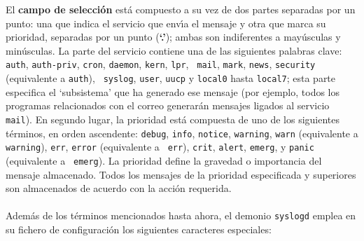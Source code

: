 El {\bf campo de selecci\'on} est\'a compuesto a su vez de dos partes 
separadas por un punto: una que indica el servicio que env\'{\i}a el mensaje y 
otra que marca su prioridad, separadas por un punto ({\bf `.'}); ambas son 
indiferentes a may\'usculas y min\'usculas. La parte del servicio contiene una 
de las siguientes palabras clave: {\tt 
auth}, {\tt auth-priv}, {\tt cron}, {\tt daemon}, {\tt kern}, {\tt lpr}, {\tt 
mail}, {\tt mark}, {\tt news}, {\tt security} (equivalente a {\tt auth}), {\tt 
syslog}, {\tt user}, {\tt uucp} y {\tt local0} hasta {\tt local7}; esta parte 
especifica el `subsistema' que ha generado ese mensaje (por ejemplo, todos los 
programas relacionados con el correo generar\'an mensajes ligados al servicio 
{\tt mail}). En segundo lugar, la prioridad est\'a compuesta de uno de los 
siguientes t\'erminos, en orden
ascendente: {\tt debug}, {\tt info}, {\tt notice}, {\tt warning}, {\tt warn} 
(equivalente a {\tt warning}), {\tt err}, {\tt error} (equivalente a {\tt 
err}), {\tt crit}, {\tt alert}, {\tt emerg}, y {\tt panic} (equivalente a {\tt 
emerg}). La prioridad define la gravedad o importancia del mensaje almacenado. 
Todos los mensajes de la prioridad especificada y superiores son almacenados de 
acuerdo con la acci\'on requerida.\\
\\Adem\'as de los t\'erminos mencionados hasta ahora, el demonio {\tt syslogd}
emplea en su fichero de configuraci\'on los siguientes caracteres especiales:
